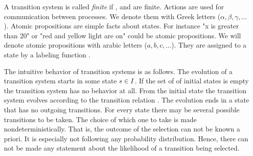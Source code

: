\documentclass[preview]{standalone}
\begin{document}
A transition system is called \emph{finite} if \states, \atomicprops and  are finite. Actions are used for communication between processes. We denote them with Greek letters ($\alpha, \beta, \gamma, \dots$). Atomic propositions are simple facts about states. For instance "x is greater than 20" or "red and yellow light are on" could be atomic propositions. We will denote atomic propositions with arabic letters ($a,b,c,\dots$). They are assigned to a state by a labeling function .

The intuitive behavior of transition systems is as follows. The evolution of a transition system starts in some state ${s} \in {I}$. If the set of \initstates of initial states is empty the transition system has no behavior at all. From the initial state the transition system evolves according to the transition relation \transitionrel. The evolution ends in a state that has no outgoing transitions. For every state there may be several possible transitions to be taken. The choice of which one to take is made nondeterministically. That is, the outcome of the selection can not be known a priori. It is especially not following any probability distribution. Hence, there can not be made any statement about the likelihood of a transition being selected.
\end{document}
